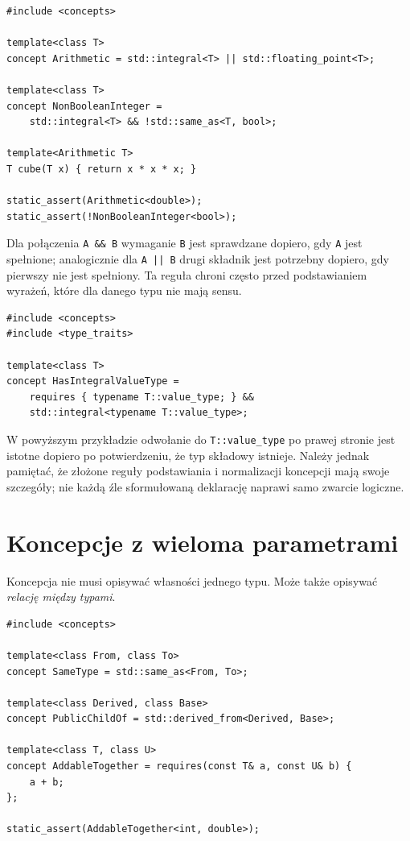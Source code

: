 \begin{lstlisting}
#include <concepts>

template<class T>
concept Arithmetic = std::integral<T> || std::floating_point<T>;

template<class T>
concept NonBooleanInteger =
    std::integral<T> && !std::same_as<T, bool>;

template<Arithmetic T>
T cube(T x) { return x * x * x; }

static_assert(Arithmetic<double>);
static_assert(!NonBooleanInteger<bool>);
\end{lstlisting}

Dla połączenia \texttt{A \&\& B} wymaganie \texttt{B} jest
sprawdzane dopiero, gdy \texttt{A} jest spełnione; analogicznie
dla \texttt{A || B} drugi składnik jest potrzebny dopiero,
gdy pierwszy nie jest spełniony. Ta reguła chroni często przed
podstawianiem wyrażeń, które dla danego typu nie mają sensu.

\begin{lstlisting}
#include <concepts>
#include <type_traits>

template<class T>
concept HasIntegralValueType =
    requires { typename T::value_type; } &&
    std::integral<typename T::value_type>;
\end{lstlisting}

W powyższym przykładzie odwołanie do \texttt{T::value\_type}
po prawej stronie jest istotne dopiero po potwierdzeniu,
że typ składowy istnieje. Należy jednak pamiętać, że złożone
reguły podstawiania i normalizacji koncepcji mają swoje szczegóły;
nie każdą źle sformułowaną deklarację naprawi samo zwarcie logiczne.

\section{Koncepcje z wieloma parametrami}

Koncepcja nie musi opisywać własności jednego typu.
Może także opisywać \emph{relację między typami}.

\begin{lstlisting}
#include <concepts>

template<class From, class To>
concept SameType = std::same_as<From, To>;

template<class Derived, class Base>
concept PublicChildOf = std::derived_from<Derived, Base>;

template<class T, class U>
concept AddableTogether = requires(const T& a, const U& b) {
    a + b;
};

static_assert(AddableTogether<int, double>);
\end{lstlisting}

